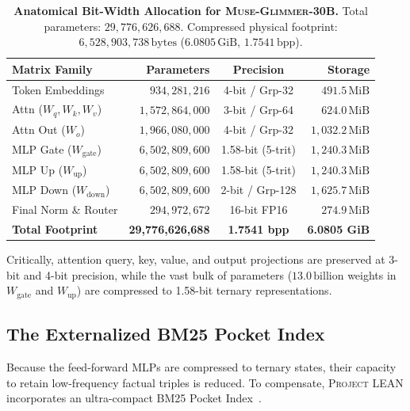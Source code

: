 \documentclass[10pt,twocolumn,letterpaper]{article}
\newcommand{\modelname}{\textsc{Muse-Glimmer-30B}}
\newcommand{\systemname}{\textsc{Project LEAN}}
\begin{document}
\begin{table}[h]
\centering
\scriptsize
\setlength{\tabcolsep}{2.5pt}
\caption{\textbf{Anatomical Bit-Width Allocation for \modelname{}.} Total parameters: $29,776,626,688$. Compressed physical footprint: $6,528,903,738\,\text{bytes}$ ($6.0805\,\text{GiB}$, $1.7541\,\text{bpp}$).}
\label{tab:layer_allocation}
\begin{tabularx}{\columnwidth}{X r c r}
\toprule
\textbf{Matrix Family} & \textbf{Parameters} & \textbf{Precision} & \textbf{Storage} \\
\midrule
Token Embeddings & $934,281,216$ & 4-bit / Grp-32 & $491.5\,\text{MiB}$ \\
Attn ($W_q, W_k, W_v$) & $1,572,864,000$ & 3-bit / Grp-64 & $624.0\,\text{MiB}$ \\
Attn Out ($W_o$) & $1,966,080,000$ & 4-bit / Grp-32 & $1,032.2\,\text{MiB}$ \\
MLP Gate ($W_{\text{gate}}$) & $6,502,809,600$ & 1.58-bit (5-trit) & $1,240.3\,\text{MiB}$ \\
MLP Up ($W_{\text{up}}$) & $6,502,809,600$ & 1.58-bit (5-trit) & $1,240.3\,\text{MiB}$ \\
MLP Down ($W_{\text{down}}$) & $6,502,809,600$ & 2-bit / Grp-128 & $1,625.7\,\text{MiB}$ \\
Final Norm \& Router & $294,972,672$ & 16-bit FP16 & $274.9\,\text{MiB}$ \\
\midrule
\textbf{Total Footprint} & \textbf{29,776,626,688} & \textbf{1.7541 bpp} & \textbf{6.0805 GiB} \\
\bottomrule
\end{tabularx}
\end{table}

Critically, attention query, key, value, and output projections are preserved at 3-bit and 4-bit precision, while the vast bulk of parameters ($13.0\,\text{billion}$ weights in $W_{\text{gate}}$ and $W_{\text{up}}$) are compressed to 1.58-bit ternary representations.

\subsection{The Externalized BM25 Pocket Index}
\label{sec:system_pocket}
Because the feed-forward MLPs are compressed to ternary states, their capacity to retain low-frequency factual triples is reduced. To compensate, \systemname{} incorporates an ultra-compact BM25 Pocket Index~\cite{robertson2009bm25}. 
\end{document}
